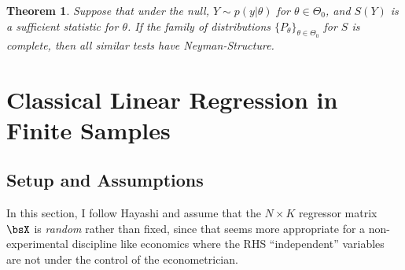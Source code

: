 \documentclass[12pt]{article}
\theoremstyle{plain}
\newtheorem{thm}{Theorem}[section]
\theoremstyle{definition}
\theoremstyle{remark}
\begin{document}
\begin{thm}
Suppose that under the null, $Y\sim p(y|\theta)$ for
$\theta\in\Theta_0$, and $S(Y)$ is a sufficient statistic for $\theta$.
If the family of distributions $\{P_\theta\}_{\theta\in\Theta_0}$ for
$S$ is complete, then all similar tests have Neyman-Structure.
\end{thm}



\clearpage
\section{Classical Linear Regression in Finite Samples}

\subsection{Setup and Assumptions}

In this section, I follow Hayashi and assume that the $N\times K$
regressor matrix $\bsX$ is \emph{random} rather than fixed, since that
seems more appropriate for a non-experimental discipline like economics
where the RHS ``independent'' variables are not under the control of the
econometrician.
\end{document}
